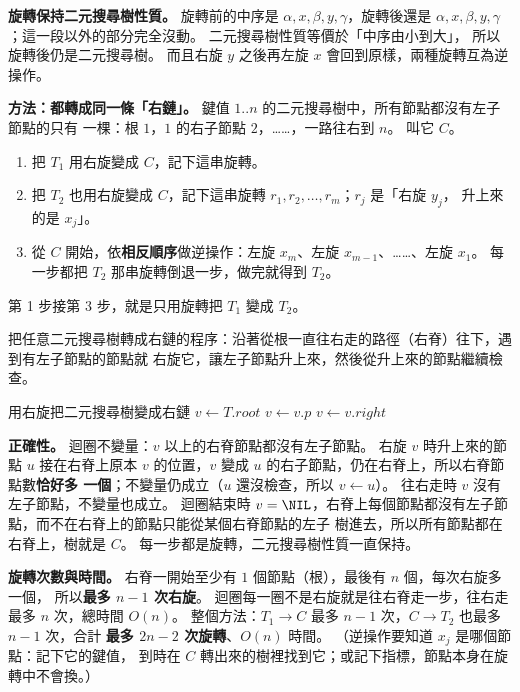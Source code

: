 \begin{pastsoln}
\textbf{旋轉保持二元搜尋樹性質。} 旋轉前的中序是 $\alpha, x, \beta, y, \gamma$，旋轉後還是
$\alpha, x, \beta, y, \gamma$；這一段以外的部分完全沒動。 二元搜尋樹性質等價於「中序由小到大」，
所以旋轉後仍是二元搜尋樹。 而且右旋 $y$ 之後再左旋 $x$ 會回到原樣，兩種旋轉互為逆操作。

\textbf{方法：都轉成同一條「右鏈」。} 鍵值 $1..n$ 的二元搜尋樹中，所有節點都沒有左子節點的只有
一棵：根 $1$，$1$ 的右子節點 $2$，……，一路往右到 $n$。 叫它 $C$。
\begin{enumerate}
\item 把 $T_1$ 用右旋變成 $C$，記下這串旋轉。
\item 把 $T_2$ 也用右旋變成 $C$，記下這串旋轉 $r_1, r_2, \ldots, r_m$；$r_j$ 是「右旋 $y_j$，
升上來的是 $x_j$」。
\item 從 $C$ 開始，依\textbf{相反順序}做逆操作：左旋 $x_m$、左旋 $x_{m-1}$、……、左旋 $x_1$。
每一步都把 $T_2$ 那串旋轉倒退一步，做完就得到 $T_2$。
\end{enumerate}
第 1 步接第 3 步，就是只用旋轉把 $T_1$ 變成 $T_2$。

把任意二元搜尋樹轉成右鏈的程序：沿著從根一直往右走的路徑（右脊）往下，遇到有左子節點的節點就
右旋它，讓左子節點升上來，然後從升上來的節點繼續檢查。

\begin{pseudo}{用右旋把二元搜尋樹變成右鏈}
    \State $v \gets T.\mathit{root}$
            \State {} 
            \State $v \gets v.p$ 
        \Else
            \State $v \gets v.\mathit{right}$ 
        \EndIf
    \EndWhile
\EndProcedure
\end{pseudo}

\textbf{正確性。} 迴圈不變量：$v$ 以上的右脊節點都沒有左子節點。 右旋 $v$ 時升上來的節點 $u$
接在右脊上原本 $v$ 的位置，$v$ 變成 $u$ 的右子節點，仍在右脊上，所以右脊節點數\textbf{恰好多
一個}；不變量仍成立（$u$ 還沒檢查，所以 $v \gets u$）。 往右走時 $v$ 沒有左子節點，不變量也成立。
迴圈結束時 $v = \NIL$，右脊上每個節點都沒有左子節點，而不在右脊上的節點只能從某個右脊節點的左子
樹進去，所以所有節點都在右脊上，樹就是 $C$。 每一步都是旋轉，二元搜尋樹性質一直保持。

\textbf{旋轉次數與時間。} 右脊一開始至少有 $1$ 個節點（根），最後有 $n$ 個，每次右旋多一個，
所以\textbf{最多 $n - 1$ 次右旋}。 迴圈每一圈不是右旋就是往右脊走一步，往右走最多 $n$ 次，總時間
$O(n)$。 整個方法：$T_1 \to C$ 最多 $n - 1$ 次，$C \to T_2$ 也最多 $n - 1$ 次，合計
\textbf{最多 $2n - 2$ 次旋轉}、$O(n)$ 時間。 （逆操作要知道 $x_j$ 是哪個節點：記下它的鍵值，
到時在 $C$ 轉出來的樹裡找到它；或記下指標，節點本身在旋轉中不會換。）


\end{pastsoln}
